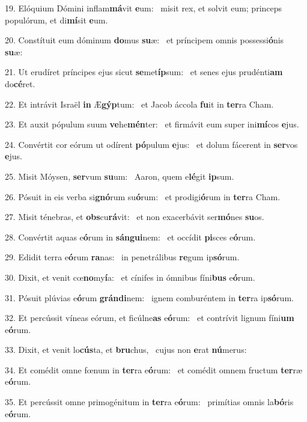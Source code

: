 19. Elóquium Dómini inflam\textbf{má}vit \textbf{e}um: \ast\  misit rex, et solvit eum; princeps populórum, et di\textbf{mí}sit \textbf{e}um.\

20. Constítuit eum dóminum \textbf{do}mus \textbf{su}æ: \ast\  et príncipem omnis possessi\textbf{ó}nis \textbf{su}æ:\

21. Ut erudíret príncipes ejus sicut \textbf{se}met\textbf{íp}sum: \ast\  et senes ejus prudénti\textbf{am} do\textbf{cé}ret.\

22. Et intrávit Israël \textbf{in} Æ\textbf{gýp}tum: \ast\  et Jacob áccola \textbf{fu}it in \textbf{ter}ra Cham.\

23. Et auxit pópulum suum \textbf{ve}he\textbf{mén}ter: \ast\  et firmávit eum super ini\textbf{mí}cos \textbf{e}jus.\

24. Convértit cor eórum ut odírent \textbf{pó}pulum \textbf{e}jus: \ast\  et dolum fácerent in \textbf{ser}vos \textbf{e}jus.\

25. Misit Móysen, \textbf{ser}vum \textbf{su}um: \ast\  Aaron, quem e\textbf{lé}git \textbf{ip}sum.\

26. Pósuit in eis verba si\textbf{gnó}rum su\textbf{ó}rum: \ast\  et prodigi\textbf{ó}rum in \textbf{ter}ra Cham.\

27. Misit ténebras, et \textbf{obs}cu\textbf{rá}vit: \ast\  et non exacerbávit ser\textbf{mó}nes \textbf{su}os.\

28. Convértit aquas e\textbf{ó}rum in \textbf{sán}\textbf{gui}nem: \ast\  et occídit \textbf{pi}sces e\textbf{ó}rum.\

29. Edidit terra e\textbf{ó}rum \textbf{ra}nas: \ast\  in penetrálibus \textbf{re}gum ip\textbf{só}rum.\

30. Dixit, et venit cœ\textbf{no}my\textbf{í}a: \ast\  et cínifes in ómnibus fíni\textbf{bus} e\textbf{ó}rum.\

31. Pósuit plúvias e\textbf{ó}rum \textbf{grán}\textbf{di}nem: \ast\  ignem comburéntem in \textbf{ter}ra ip\textbf{só}rum.\

32. Et percússit víneas eórum, et ficúlne\textbf{as} e\textbf{ó}rum: \ast\  et contrívit lignum fíni\textbf{um} e\textbf{ó}rum.\

33. Dixit, et venit lo\textbf{cús}ta, et \textbf{bru}chus, \ast\  cujus non \textbf{e}rat \textbf{nú}merus:\

34. Et comédit omne fœnum in \textbf{ter}ra e\textbf{ó}rum: \ast\  et comédit omnem fructum \textbf{ter}ræ e\textbf{ó}rum.\

35. Et percússit omne primogénitum in \textbf{ter}ra e\textbf{ó}rum: \ast\  primítias omnis la\textbf{bó}ris e\textbf{ó}rum.\

